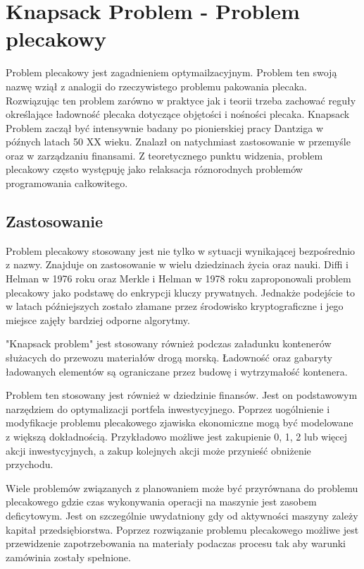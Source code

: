 \section{Knapsack Problem - Problem plecakowy}
Problem plecakowy jest zagadnieniem optymailzacyjnym. Problem ten swoją nazwę wziął z analogii do rzeczywistego problemu pakowania plecaka. Rozwiązując ten problem zarówno w praktyce jak i teorii trzeba zachować reguły określające ładowność plecaka dotyczące objętości i nośności plecaka. Knapsack Problem zaczął być intensywnie badany po pionierskiej pracy Dantziga\cite{DantzigArticle} w późnych latach 50 XX wieku. Znalazł on natychmiast zastosowanie w przemyśle oraz w zarządzaniu finansami. Z teoretycznego punktu widzenia, problem plecakowy często występuję jako relaksacja róznorodnych problemów programowania całkowitego\cite{PisingerThesis}.
\subsection{Zastosowanie}
Problem plecakowy stosowany jest nie tylko w sytuacji wynikającej bezpośrednio z nazwy. Znajduje on zastosowanie w wielu dziedzinach życia oraz nauki. Diffi i Helman\cite{DiffieHelmanArticle} w 1976 roku oraz Merkle i Helman\cite{MerkleHelmanArticle} w 1978 roku zaproponowali problem plecakowy jako podstawę do enkrypcji kluczy prywatnych. Jednakże podejście to w latach późniejszych zostało złamane przez środowisko kryptograficzne i jego miejsce zajęły bardziej odporne algorytmy.

"Knapsack problem" jest stosowany również podczas załadunku kontenerów służacych do przewozu materiałów drogą morską. Ładowność oraz gabaryty ładowanych elementów są ograniczane przez budowę i wytrzymałość kontenera.

Problem ten stosowany jest również w dziedzinie finansów. Jest on podstawowym narzędziem do optymalizacji portfela inwestycyjnego. Poprzez uogólnienie i modyfikacje problemu plecakowego zjawiska ekonomiczne mogą być modelowane z większą dokładnością. Przykładowo możliwe jest zakupienie 0, 1, 2 lub więcej akcji inwestycyjnych, a zakup kolejnych akcji może przynieść obniżenie przychodu.

Wiele problemów związanych z planowaniem może być przyrównana do problemu plecakowego gdzie czas wykonywania operacji na maszynie jest zasobem deficytowym. Jest on szczególnie uwydatniony gdy od aktywności maszyny zależy kapitał przedsiębiorstwa. Poprzez rozwiązanie problemu plecakowego możliwe jest przewidzenie zapotrzebowania na materiały podaczas procesu tak aby warunki zamówinia zostały spełnione\cite{BartholdiChapter}.

